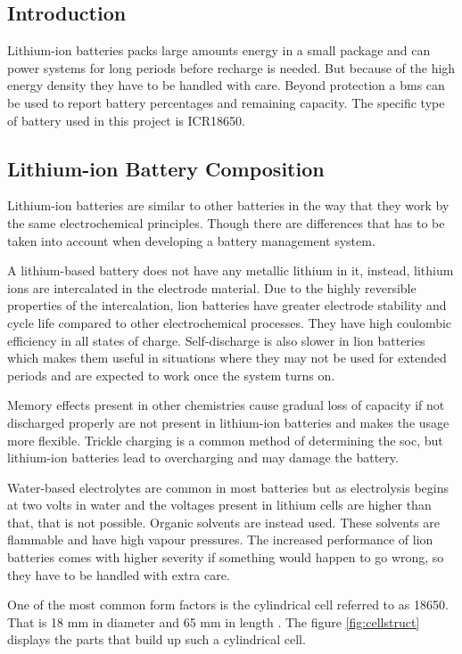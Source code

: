 \subsection{Introduction}
Lithium-ion batteries packs large amounts energy in a small package and can power systems for long periods before recharge is needed. But because of the high energy density they have to be handled with care. Beyond protection a \gls{bms} can be used to report battery percentages and remaining capacity. The specific type of battery used in this project is ICR18650.

\subsection{Lithium-ion Battery Composition}
Lithium-ion batteries are similar to other batteries in the way that they work by the same electrochemical principles. Though there are differences that has to be taken into account when developing a battery management system.

A lithium-based battery does not have any metallic lithium in it, instead, lithium ions are intercalated in the electrode material. Due to the highly reversible properties of the intercalation, \gls{lion} batteries have greater electrode stability and cycle life compared to other electrochemical processes. They have high coulombic efficiency in all states of charge. Self-discharge is also slower in \gls{lion} batteries which makes them useful in situations where they may not be used for extended periods and are expected to work once the system turns on.

Memory effects present in other chemistries cause gradual loss of capacity if not discharged properly are not present in lithium-ion batteries and makes the usage more flexible. Trickle charging is a common method of determining the \gls{soc}, but lithium-ion batteries lead to overcharging and may damage the battery.

Water-based electrolytes are common in most batteries but as electrolysis begins at two volts in water and the voltages present in lithium cells are higher than that, that is not possible. Organic solvents are instead used. These solvents are flammable and have high vapour pressures. The increased performance of \gls{lion} batteries comes with higher severity if something would happen to go wrong, so they have to be handled with extra care.

One of the most common form factors is the cylindrical cell referred to as 18650. That is 18 mm in diameter and 65 mm in length \cite{book26}. The figure \autoref{fig:cellstruct} displays the parts that build up such a cylindrical cell.

